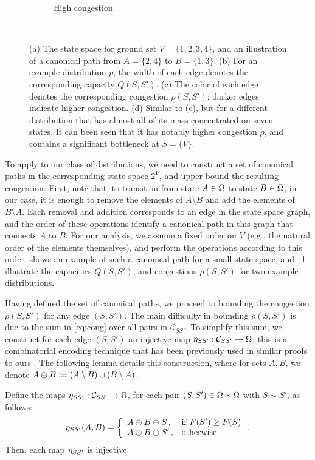 \begin{figure}[tbp]
\begin{subfigure}[b]{\subflen}
    \caption{High congestion}
    \label{fig:cong4}
  \end{subfigure}\\
  \caption{(a) The state space for ground set $V = \{1, 2, 3, 4\}$, and an illustration of a canonical path from $A = \{2, 4\}$ to $B = \{1, 3\}$.
  (b) For an example distribution $p$, the width of each edge denotes the corresponding capacity $Q(S, S')$.
  (c) The color of each edge denotes the corresponding congestion $\rho(S, S')$; darker edges indicate higher congestion.
  (d) Similar to (c), but for a different distribution that has almost all of its mass concentrated on seven states.
  It can been seen that it has notably higher congestion $\rho$, and contains a significant bottleneck at $S = \{V\}$.
  }
  \label{fig:cong}
\end{figure}

To apply  to our class of distributions, we need to construct a set of canonical paths in the corresponding state space $2^V$, and upper bound the resulting congestion.
First, note that, to transition from state $A \in \ss$ to state $B \in \ss$, in our case, it is enough to remove the elements of $A \setminus B$ and add the elements of $B \setminus A$.
Each removal and addition corresponds to an edge in the state space graph, and the order of these operations identify a canonical path in this graph that connects $A$ to $B$.
For our analysis, we assume a fixed order on $V$ (e.g., the natural order of the elements themselves), and perform the operations according to this order.
 shows an example of such a canonical path for a small state space, and --\ref{fig:cong4} illustrate the capacities $Q(S, S')$, and congestions $\rho(S, S')$ for two example distributions.

Having defined the set of canonical paths, we proceed to bounding the congestion $\rho(S, S')$ for any edge $(S, S')$.
The main difficulty in bounding $\rho(S, S')$ is due to the sum in \eqref{eq:cong} over all pairs in $\mathcal{C}_{SS'}$.
To simplify this sum, we construct for each edge $(S, S')$ an injective map $\ess : \mathcal{C}_{SS'} \to \ss$; this is a combinatorial encoding technique that has been previously used in similar proofs to ours \citep{jerrum03}.
The following lemma details this construction, where for sets $A, B$, we denote $A \oplus B \defeq (A \setminus B)\cup(B \setminus A)$.

\begin{lemma} \label{lem:inj}
Define the maps $\ess : \mathcal{C}_{SS'} \to \ss$, for each pair $(S, S') \in \ss \times \ss$ with $S \sim S'$, as follows:
\begin{align*}
  \ess(A, B) = \twopartdefo{A \oplus B \oplus S}{F(S') \geq F(S)}{A \oplus B \oplus S'}.
\end{align*}
Then, each map $\ess$ is injective.
\end{lemma}

